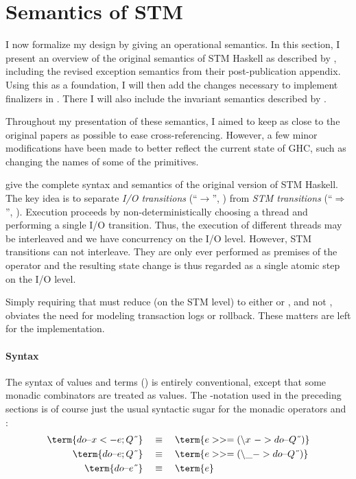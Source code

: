 \section{Semantics of STM}
\label{sec:stm-orig-semantics}

I now formalize my design by giving an operational semantics.
In this section, I present an overview of the original semantics of STM Haskell as described by \textcite{harris-et-al-2005}, including the revised exception semantics from their post-publication appendix.
Using this as a foundation, I will then add the changes necessary to implement finalizers in .
There I will also include the invariant semantics described by \textcite{harris-peytonjones-2006}.

Throughout my presentation of these semantics, I aimed to keep as close to the original papers as possible to ease cross-referencing.
However, a few minor modifications have been made to better reflect the current state of GHC, such as changing the names of some of the primitives.

\bigskip
{} give the complete syntax and semantics of the original version of STM Haskell.
The key idea is to separate \emph{I/O transitions} (``$\rightarrow$'', ) from \emph{STM transitions} (``$\Rightarrow$'', ).
Execution proceeds by non-deterministically choosing a thread and performing a single I/O transition.
Thus, the execution of different threads may be interleaved and we have concurrency on the I/O level.
However, STM transitions can not interleave.
They are only ever performed as premises of the  operator and the resulting state change is thus regarded as a single atomic step on the I/O level.

Simply requiring that  must reduce (on the STM level) to either  or , and not , obviates the need for modeling transaction logs or rollback.
These matters are left for the implementation.

\clearpage

\paragraph{Syntax}

The syntax of values and terms () is entirely conventional, except that some monadic combinators are treated as values.
%
The -notation used in the preceding sections is of course just the usual syntactic sugar for the monadic operators \term{>>=} and :
\begin{align*}
\term{do \string{ x <- e; Q \string}} & \quad\equiv\quad \term{e >>= (\string\x \ -> do \string{ Q \string})}\\
\term{do \string{ e; Q \string}} & \quad\equiv\quad \term{e >>= (\string\_ -> do \string{ Q \string})}\\
\term{do \string{ e \string}} & \quad\equiv\quad \term{e}
\end{align*}

